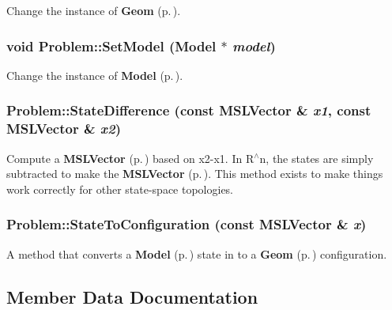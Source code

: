 Change the instance of {\bf Geom} {\rm (p.\,\pageref{classGeom})}.

\subsubsection{\setlength{\rightskip}{0pt plus 5cm}void Problem::Set\-Model ({\bf Model} $\ast$ {\em model})}\label{classProblem_a3}


Change the instance of {\bf Model} {\rm (p.\,\pageref{classModel})}.

\subsubsection{ Problem::State\-Difference (const {\bf MSLVector} \& {\em x1}, const {\bf MSLVector} \& {\em x2})\hspace{0.3cm}{\tt  [virtual]}}\label{classProblem_a10}


Compute a {\bf MSLVector} {\rm (p.\,\pageref{classMSLVector})} based on x2-x1. In R$^\wedge$n, the states are simply subtracted to make the {\bf MSLVector} {\rm (p.\,\pageref{classMSLVector})}. This method exists to make things work correctly for other state-space topologies.

\subsubsection{ Problem::State\-To\-Configuration (const {\bf MSLVector} \& {\em x})\hspace{0.3cm}{\tt  [virtual]}}\label{classProblem_a9}


A method that converts a {\bf Model} {\rm (p.\,\pageref{classModel})} state in to a {\bf Geom} {\rm (p.\,\pageref{classGeom})} configuration.



\subsection{Member Data Documentation}
